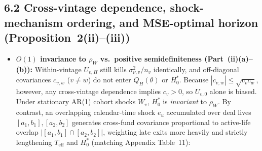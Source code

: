 \documentclass[10.5pt]{article}
\begin{document}
\subsection*{6.2 Cross-vintage dependence, shock-mechanism ordering, and MSE-optimal horizon (Proposition~2(ii)--(iii))}

\begin{itemize}
  \item \textbf{$O(1)$ invariance to $\rho_W$ vs.\ positive semidefiniteness (Part~(ii)(a)--(b)):} Within-vintage $U_{v,H}$ still kills $\sigma_{\nu,v}^2/n_v$ identically, and off-diagonal covariances $c_{v,w}$ ($v\neq w$) do not enter $Q_H(\theta)$ or $H_0^\ast$. Because $|c_{v,w}|\le\sqrt{c_v c_w}$, however, any cross-vintage dependence implies $c_v>0$, so $U_{v,0}$ alone is biased. Under stationary AR(1) cohort shocks $W_v$, $H_0^\ast$ is \emph{invariant} to $\rho_W$. By contrast, an overlapping calendar-time shock $e_u$ accumulated over deal lives $[a_1,b_1],[a_2,b_2]$ generates cross-fund covariance proportional to active-life overlap $|[a_1,b_1]\cap[a_2,b_2]|$, weighting late exits more heavily and strictly lengthening $T_{\mathrm{eff}}$ and $H_0^\ast$ (matching Appendix Table~11):
\end{itemize}

{\footnotesize
\begin{center}
\setlength{\tabcolsep}{4.5pt}
\end{center}
}
\end{document}
